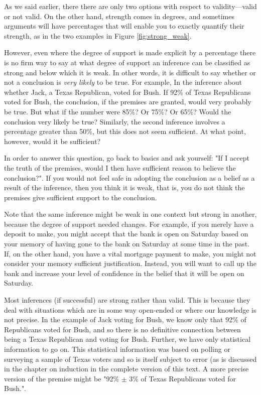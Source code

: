 As we said earlier, there there are only two options with respect to validity---valid or not valid. On the other hand, strength comes in degrees, and sometimes arguments will have percentages that will enable you to exactly quantify their strength, as in the two examples in Figure \ref{fig:strong_weak}.

However, even where the degree of support is made explicit by a percentage there is no firm way to say at what degree of support an inference can be classified as strong and below which it is weak. In other words, it is difficult to say whether or not a conclusion is \textit{very likely} to be true. For example, In the inference about whether Jack, a Texas Republican, voted for Bush. If 92\% of Texas Republicans voted for Bush, the conclusion, if the premises are granted, would very probably be true. But what if the number were 85\%? Or 75\%? Or 65\%? Would the conclusion very likely be true? Similarly, the second inference involves a percentage greater than 50\%, but this does not seem sufficient. At what point, however, would it be sufficient?

In order to answer this question, go back to basics and ask yourself: "If I accept the truth of the premises, would I then have sufficient reason to believe the conclusion?". If you would not feel safe in adopting the conclusion as a belief as a result of the inference, then you think it is weak, that is, you do not think the premises give sufficient support to the conclusion.

Note that the same inference might be weak in one context but strong in another, because the degree of support needed changes. For example, if you merely have a deposit to make, you might accept that the bank is open on Saturday based on your memory of having gone to the bank on Saturday at some time in the past. If, on the other hand, you have a vital mortgage payment to make, you might not consider your memory sufficient justification. Instead, you will want to call up the bank and increase your level of confidence in the belief that it will be open on Saturday.

Most inferences (if successful) are strong rather than valid. This is because they deal with situations which are in some way open-ended or where our knowledge is not precise. In the example of Jack voting for Bush, we know only that 92\% of Republicans voted for Bush, and so there is no definitive connection between being a Texas Republican and voting for Bush. Further, we have only statistical information to go on. This statistical information was based on polling or surveying a sample of Texas voters and so is itself subject to error (as is discussed in the chapter on induction in the complete version of this text.\label{ver_var}  A more precise version of the premise might be "92\% $\pm$ 3\% of Texas Republicans voted for Bush.".

